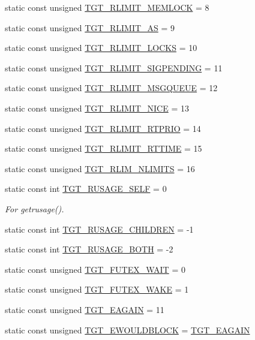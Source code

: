\begin{DoxyCompactItemize}
\item 
static const unsigned \hyperlink{classLinux_acfa2b204cbb5bca2fbc2c1f15649aca2}{TGT\_\-RLIMIT\_\-MEMLOCK} = 8
\item 
static const unsigned \hyperlink{classLinux_a6e372e5f43e2da816e9bbf5088d89c21}{TGT\_\-RLIMIT\_\-AS} = 9
\item 
static const unsigned \hyperlink{classLinux_a173b686f10c7ca880e7a9527195a1816}{TGT\_\-RLIMIT\_\-LOCKS} = 10
\item 
static const unsigned \hyperlink{classLinux_ac21355dd5e59b445cb99e98fcb2b96ba}{TGT\_\-RLIMIT\_\-SIGPENDING} = 11
\item 
static const unsigned \hyperlink{classLinux_a9f8bde4350834d90717317d21b3b9c51}{TGT\_\-RLIMIT\_\-MSGQUEUE} = 12
\item 
static const unsigned \hyperlink{classLinux_a23805c9c845a1a5023596d06fc7ee2e0}{TGT\_\-RLIMIT\_\-NICE} = 13
\item 
static const unsigned \hyperlink{classLinux_ab7db6b4a69a3034ee6799727a6e0181c}{TGT\_\-RLIMIT\_\-RTPRIO} = 14
\item 
static const unsigned \hyperlink{classLinux_a7d1f3330f2489be24c06fd967c6c3938}{TGT\_\-RLIMIT\_\-RTTIME} = 15
\item 
static const unsigned \hyperlink{classLinux_a2156324051ade9812d3df5b805264862}{TGT\_\-RLIM\_\-NLIMITS} = 16
\item 
static const int \hyperlink{classLinux_a9e303b6c52672934210e6db497f0da88}{TGT\_\-RUSAGE\_\-SELF} = 0
\begin{DoxyCompactList}\small\item\em For getrusage(). \item\end{DoxyCompactList}\item 
static const int \hyperlink{classLinux_a9a340e7463be441b8aeb8ea0a109e1bc}{TGT\_\-RUSAGE\_\-CHILDREN} = -\/1
\item 
static const int \hyperlink{classLinux_af555fb2e49227259e6f6a78e2f6996e4}{TGT\_\-RUSAGE\_\-BOTH} = -\/2
\item 
static const unsigned \hyperlink{classLinux_a50b3e4a3042049bc573124af60355eb6}{TGT\_\-FUTEX\_\-WAIT} = 0
\item 
static const unsigned \hyperlink{classLinux_adc16305e4b504b1250c0684ac15f529d}{TGT\_\-FUTEX\_\-WAKE} = 1
\item 
static const unsigned \hyperlink{classLinux_aefc7de6c39dd68b971f1fe2c797acd04}{TGT\_\-EAGAIN} = 11
\item 
static const unsigned \hyperlink{classLinux_ad8327bcce81f6ea29f92e6422808bbdd}{TGT\_\-EWOULDBLOCK} = \hyperlink{classLinux_aefc7de6c39dd68b971f1fe2c797acd04}{TGT\_\-EAGAIN}

\end{DoxyCompactItemize}
